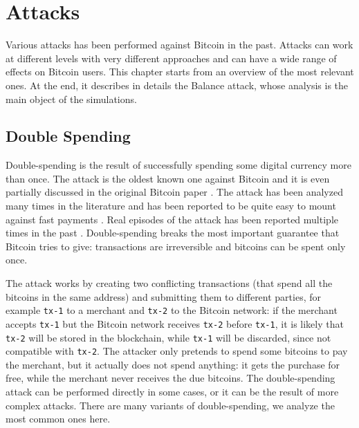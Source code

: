 \chapter{Attacks}
\label{chapter:attacks}
Various attacks has been performed against Bitcoin in the past.
Attacks can work at different levels with very different approaches and can have a wide range of effects on Bitcoin users.
This chapter starts from an overview of the most relevant ones.
At the end, it describes in details the Balance attack, whose analysis is the main object of the simulations.

\section{Double Spending}
\label{sec:double-spending}
Double-spending is the result of successfully spending some digital currency more than once.
The attack is the oldest known one against Bitcoin and it is even partially discussed in the original Bitcoin paper \cite{bitcoin_2009}.
The attack has been analyzed many times in the literature \cite{double_spending_fast_payments, double_spending_two_for_one, double_spending_bitcoin_economics, double_spending_fast_analysis_2014} and has been reported to be quite easy to mount against fast payments \cite{double_spending_fast_payments}.
Real episodes of the attack has been reported multiple times in the past \cite{double_spending_ghash, double_spending_stackexchange}.
Double-spending breaks the most important guarantee that Bitcoin tries to give:
transactions are irreversible and bitcoins can be spent only once.

The attack works by creating two conflicting transactions (that spend all the bitcoins in the same address) and submitting them to different parties, for example \texttt{tx-1} to a merchant and \texttt{tx-2} to the Bitcoin network:
if the merchant accepts \texttt{tx-1} but the Bitcoin network receives \texttt{tx-2} before \texttt{tx-1}, it is likely that \texttt{tx-2} will be stored in the blockchain, while \texttt{tx-1} will be discarded, since not compatible with \texttt{tx-2}.
The attacker only pretends to spend some bitcoins to pay the merchant, but it actually does not spend anything:
it gets the purchase for free, while the merchant never receives the due bitcoins.
The double-spending attack can be performed directly in some cases, or it can be the result of more complex attacks.
There are many variants of double-spending, we analyze the most common ones here.

